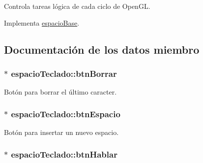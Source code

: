 Controla tareas lógica de cada ciclo de Open\+G\+L. 



Implementa \hyperlink{classespacio_base_a9b94b1106cd478dd78bc42078a36d013}{espacio\+Base}.



\subsection{Documentación de los datos miembro}
\hypertarget{classespacio_teclado_a68242d035fdf24a605e21d798ecf1a93}{}
\subsubsection[{btn\+Borrar}]{$\ast$ espacio\+Teclado\+::btn\+Borrar\hspace{0.3cm}{\ttfamily [private]}}\label{classespacio_teclado_a68242d035fdf24a605e21d798ecf1a93}


Botón para borrar el último caracter. 

\hypertarget{classespacio_teclado_abf7bb12c95256d20e421831fea3d23e1}{}
\subsubsection[{btn\+Espacio}]{$\ast$ espacio\+Teclado\+::btn\+Espacio\hspace{0.3cm}{\ttfamily [private]}}\label{classespacio_teclado_abf7bb12c95256d20e421831fea3d23e1}


Botón para insertar un nuevo espacio. 

\hypertarget{classespacio_teclado_a401d7d71c05c9f234010e33adfe51d04}{}
\subsubsection[{btn\+Hablar}]{$\ast$ espacio\+Teclado\+::btn\+Hablar\hspace{0.3cm}{\ttfamily [private]}}\label{classespacio_teclado_a401d7d71c05c9f234010e33adfe51d04}


